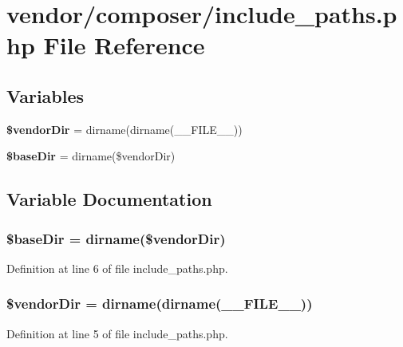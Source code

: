 \section{vendor/composer/include\+\_\+paths.php File Reference}
\label{include__paths_8php}
\subsection*{Variables}
\begin{DoxyCompactItemize}
\item 
{\bf \$vendor\+Dir} = dirname(dirname(\+\_\+\+\_\+\+F\+I\+L\+E\+\_\+\+\_\+))
\item 
{\bf \$base\+Dir} = dirname(\$vendor\+Dir)
\end{DoxyCompactItemize}


\subsection{Variable Documentation}
\subsubsection[{\$base\+Dir}]{\setlength{\rightskip}{0pt plus 5cm}\$base\+Dir = dirname(\$vendor\+Dir)}\label{include__paths_8php_a873fc20cf44ad2f766893e95aab8df78}


Definition at line 6 of file include\+\_\+paths.\+php.

\subsubsection[{\$vendor\+Dir}]{\setlength{\rightskip}{0pt plus 5cm}\$vendor\+Dir = dirname(dirname(\+\_\+\+\_\+\+F\+I\+L\+E\+\_\+\+\_\+))}\label{include__paths_8php_a7fbc3633c79d7461383710e09d497fb0}


Definition at line 5 of file include\+\_\+paths.\+php.

